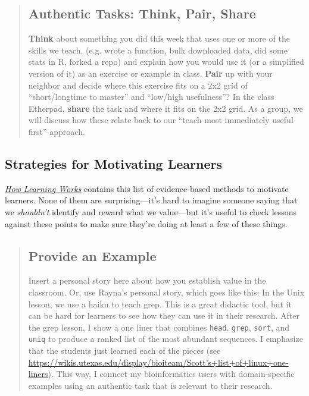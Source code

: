 \begin{quotation}   %
\subsection*{Authentic Tasks: Think, Pair, Share}

\textbf{Think} about something you did this week that uses one or more of the skills we teach,
(e.g. wrote a function, bulk downloaded data, did some stats in R, forked a repo)
and explain how you would use it (or a simplified version of it) as an exercise or example in class.
\textbf{Pair} up with your neighbor and decide where this exercise fits on a 2x2 grid of ``short/longtime to master'' and ``low/high usefulness''?
In the class Etherpad, \textbf{share} the task and where it fits on the 2x2 grid.
As a group, we will discuss how these relate back to our ``teach most immediately useful first'' approach.
\end{quotation}   %

\subsection*{Strategies for Motivating Learners}

\emph{\href{http://www.amazon.com/How-Learning-Works-Research-Based-Jossey-Bass/dp/0470484101/}{How Learning Works}}
contains this list of evidence-based methods to motivate learners.
None of them are surprising---it's hard to imagine someone saying
that we \emph{shouldn't} identify and reward what we value---but
it's useful to check lessons against these points
to make sure they're doing at least a few of these things.

\begin{quotation}   %
\subsection*{Provide an Example}

Insert a personal story here about how you establish value in the classroom.
Or, use Rayna's personal story, which goes like this:
In the Unix lesson, we use a haiku to teach grep.
This is a great didactic tool, but it can be hard for learners to see how they can use it in their research.
After the grep lesson, I show a one liner that combines \texttt{head}, \texttt{grep}, \texttt{sort}, and \texttt{uniq}
 to produce a ranked list of the most abundant sequences.
I emphasize that the students just learned each of the pieces
(see \href{https://wikis.utexas.edu/display/bioiteam/Scott's+list+of+linux+one-liners}{https://wikis.utexas.edu/display/bioiteam/Scott's+list+of+linux+one-liners}).
This way, I connect my bioinformatics users with domain-specific examples
using an authentic task that is relevant to their research.
\end{quotation}   %

